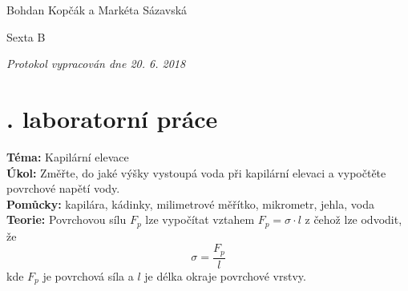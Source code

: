 \documentclass[12pt, a4paper]{article}
\begin{document}
\hfill Bohdan Kopčák a Markéta Sázavská\par
\hfill Sexta B\par
\hfill {\it Protokol vypracován dne 20. 6. 2018}\par

\section*{. laboratorní práce}
\tab \textbf{Téma: }
Kapilární elevace\\[4pt]
\tab \textbf{Úkol: }
Změřte, do jaké výšky vystoupá voda při kapilární elevaci a vypočtěte povrchové napětí vody.\\[4pt]
\tab \textbf{Pomůcky: }
kapilára, kádinky, milimetrové měřítko, mikrometr, jehla, voda\\[4pt]
\tab \textbf{Teorie: }
Povrchovou sílu $F_p$ lze vypočítat vztahem $F_p = \sigma \cdot l$ z čehož lze odvodit, že 
$$\sigma = \dfrac{F_p}{l}$$
kde $F_p$ je povrchová síla a $l$ je délka okraje povrchové vrstvy.
\end{document}
